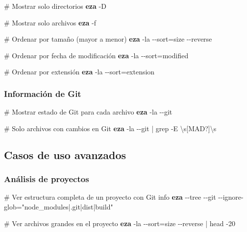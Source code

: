 \documentclass[
  11pt,
  letterpaper,
  oneside,
  openany]{scrbook}
\newenvironment{Shaded}{}{}
\newcommand{\AttributeTok}[1]{\textcolor[rgb]{0.84,0.23,0.29}{#1}}
\newcommand{\CommentTok}[1]{\textcolor[rgb]{0.42,0.45,0.49}{#1}}
\newcommand{\ExtensionTok}[1]{\textcolor[rgb]{0.84,0.23,0.29}{\textbf{#1}}}
\newcommand{\FunctionTok}[1]{\textcolor[rgb]{0.44,0.26,0.76}{#1}}
\newcommand{\KeywordTok}[1]{\textcolor[rgb]{0.84,0.23,0.29}{#1}}
\newcommand{\NormalTok}[1]{\textcolor[rgb]{0.14,0.16,0.18}{#1}}
\newcommand{\OperatorTok}[1]{\textcolor[rgb]{0.14,0.16,0.18}{#1}}
\newcommand{\StringTok}[1]{\textcolor[rgb]{0.01,0.18,0.38}{#1}}
\begin{document}
\begin{Shaded}
\begin{Highlighting}[]
\CommentTok{\# Mostrar solo directorios}
\ExtensionTok{eza} \AttributeTok{{-}D}

\CommentTok{\# Mostrar solo archivos}
\ExtensionTok{eza} \AttributeTok{{-}f}

\CommentTok{\# Ordenar por tamaño (mayor a menor)}
\ExtensionTok{eza} \AttributeTok{{-}la} \AttributeTok{{-}{-}sort}\OperatorTok{=}\NormalTok{size }\AttributeTok{{-}{-}reverse}

\CommentTok{\# Ordenar por fecha de modificación}
\ExtensionTok{eza} \AttributeTok{{-}la} \AttributeTok{{-}{-}sort}\OperatorTok{=}\NormalTok{modified}

\CommentTok{\# Ordenar por extensión}
\ExtensionTok{eza} \AttributeTok{{-}la} \AttributeTok{{-}{-}sort}\OperatorTok{=}\NormalTok{extension}
\end{Highlighting}
\end{Shaded}

\subsubsection{Información de Git}\label{informaciuxf3n-de-git}

\begin{Shaded}
\begin{Highlighting}[]
\CommentTok{\# Mostrar estado de Git para cada archivo}
\ExtensionTok{eza} \AttributeTok{{-}la} \AttributeTok{{-}{-}git}

\CommentTok{\# Solo archivos con cambios en Git}
\ExtensionTok{eza} \AttributeTok{{-}la} \AttributeTok{{-}{-}git} \KeywordTok{|} \FunctionTok{grep} \AttributeTok{{-}E} \StringTok{\textquotesingle{}\textbackslash{}s[MAD?]\textbackslash{}s\textquotesingle{}}
\end{Highlighting}
\end{Shaded}

\subsection{Casos de uso avanzados}\label{casos-de-uso-avanzados}

\subsubsection{Análisis de proyectos}\label{anuxe1lisis-de-proyectos}

\begin{Shaded}
\begin{Highlighting}[]
\CommentTok{\# Ver estructura completa de un proyecto con Git info}
\ExtensionTok{eza} \AttributeTok{{-}{-}tree} \AttributeTok{{-}{-}git} \AttributeTok{{-}{-}ignore{-}glob}\OperatorTok{=}\StringTok{"node\_modules|.git|dist|build"}

\CommentTok{\# Ver archivos grandes en el proyecto}
\ExtensionTok{eza} \AttributeTok{{-}la} \AttributeTok{{-}{-}sort}\OperatorTok{=}\NormalTok{size }\AttributeTok{{-}{-}reverse} \KeywordTok{|} \FunctionTok{head} \AttributeTok{{-}20}
\end{Highlighting}
\end{Shaded}
\end{document}
